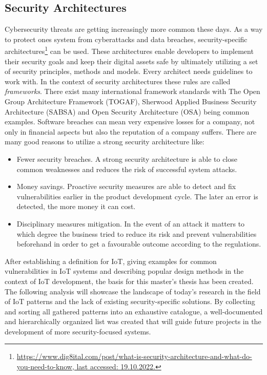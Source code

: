 \subsection{Security Architectures}
Cybersecurity threats are getting increasingly more common these days. As a way to protect ones system from cyberattacks and data breaches, security-specific architectures\footnote{\href{https://www.dig8ital.com/post/what-is-security-architecture-and-what-do-you-need-to-know}{https://www.dig8ital.com/post/what-is-security-architecture-and-what-do-you-need-to-know, last accessed: 19.10.2022.}} can be used. These architectures enable developers to implement their security goals and keep their digital assets safe by ultimately utilizing a set of security principles, methods and models. Every architect needs guidelines to work with. In the context of security architectures these rules are called \emph{frameworks}. There exist many international framework standards with The Open Group Architecture Framework (TOGAF), Sherwood Applied Business Security Architecture (SABSA) and Open Security Architecture (OSA) being common examples. Software breaches can mean very expensive losses for a company, not only in financial aspects but also the reputation of a company suffers. There are many good reasons to utilize a strong security architecture like:\footnotemark[\value{footnote}] 
\begin{itemize}
	\item Fewer security breaches. A strong security architecture is able to close common weaknesses and reduces the risk of successful system attacks. 
	\item Money savings. Proactive security measures are able to detect and fix vulnerabilities earlier in the product development cycle. The later an error is detected, the more money it can cost. 
	\item Disciplinary measures mitigation. In the event of an attack it matters to which degree the business tried to reduce its risk and prevent vulnerabilities beforehand in order to get a favourable outcome according to the regulations.
\end{itemize}

After establishing a definition for IoT, giving examples for common vulnerabilities in IoT systems and describing popular design methods in the context of IoT development, the basis for this master's thesis has been created. The following analysis will showcase the landscape of today's research in the field of IoT patterns and the lack of existing security-specific solutions. By collecting and sorting all gathered patterns into an exhaustive catalogue, a well-documented and hierarchically organized list was created that will guide future projects in the development of more security-focused systems.   

